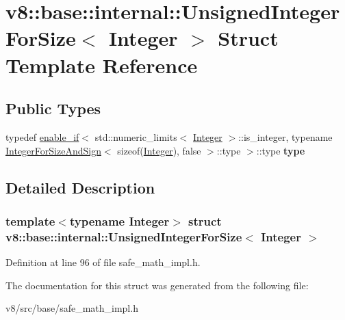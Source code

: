 \hypertarget{structv8_1_1base_1_1internal_1_1UnsignedIntegerForSize}{}\section{v8\+:\+:base\+:\+:internal\+:\+:Unsigned\+Integer\+For\+Size$<$ Integer $>$ Struct Template Reference}
\label{structv8_1_1base_1_1internal_1_1UnsignedIntegerForSize}
\subsection*{Public Types}
\begin{DoxyCompactItemize}
\item 
\mbox{\label{structv8_1_1base_1_1internal_1_1UnsignedIntegerForSize_ac22b922d03077bff454fa4cb1529cb93}} 
typedef \mbox{\hyperlink{structv8_1_1base_1_1internal_1_1enable__if}{enable\+\_\+if}}$<$ std\+::numeric\+\_\+limits$<$ \mbox{\hyperlink{classv8_1_1Integer}{Integer}} $>$\+::is\+\_\+integer, typename \mbox{\hyperlink{structv8_1_1base_1_1internal_1_1IntegerForSizeAndSign}{Integer\+For\+Size\+And\+Sign}}$<$ sizeof(\mbox{\hyperlink{classv8_1_1Integer}{Integer}}), false $>$\+::type $>$\+::type {\bfseries type}
\end{DoxyCompactItemize}


\subsection{Detailed Description}
\subsubsection*{template$<$typename Integer$>$\newline
struct v8\+::base\+::internal\+::\+Unsigned\+Integer\+For\+Size$<$ Integer $>$}



Definition at line 96 of file safe\+\_\+math\+\_\+impl.\+h.



The documentation for this struct was generated from the following file\+:\begin{DoxyCompactItemize}
\item 
v8/src/base/safe\+\_\+math\+\_\+impl.\+h\end{DoxyCompactItemize}
